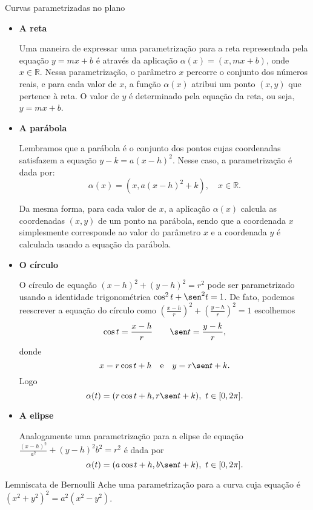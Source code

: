 \begin{example}{Curvas parametrizadas no plano}{}
    \begin{itemize}[label=\color{examplescolor}\textbullet]
        \item \textbf{A reta}
        
        Uma maneira de expressar uma parametrização para a reta representada pela equação $y = mx + b$ é através da aplicação $\alpha(x) = (x, mx + b)$, onde $x \in \mathbb{R}$. Nessa parametrização, o parâmetro $x$ percorre o conjunto dos números reais, e para cada valor de $x$, a função $\alpha(x)$ atribui um ponto $(x, y)$ que pertence à reta. O valor de $y$ é determinado pela equação da reta, ou seja, $y = mx + b$. 

        \item \textbf{A parábola}

Lembramos que a parábola é o conjunto dos pontos cujas coordenadas satisfazem a equação $y - k = a(x - h)^2$.  Nesse caso, a parametrização é dada por:
\[ \alpha(x) = (x, a(x - h)^2 + k), \quad x \in \mathbb{R}.  \]

Da mesma forma, para cada valor de $x$, a aplicação $\alpha(x)$ calcula as coordenadas $(x, y)$ de um ponto na parábola, sendo que a coordenada $x$ simplesmente corresponde ao valor do parâmetro $x$ e a coordenada $y$ é calculada usando a equação da parábola. 

\item \textbf{O círculo}
        
        O círculo de equação $(x-h)^2+(y-h)^2=r^2$ pode ser parametrizado usando a identidade trigonométrica $\cos^2t+\sen^2t=1$. De fato, podemos reescrever a equação do círculo como $\left(\frac{x-h}{r}\right)^2+\left(\frac{y-h}{r}\right)^2=1$ escolhemos
        $$\cos t = \frac{x-h}{r} \quad \mbox \quad \sen t = \frac{y-k}{r},$$
        donde
        $$x=r\cos t + h \quad \mbox{e} \quad y=r\sen t+k.$$
        Logo $$\alpha(t)=(r\cos t + h,r\sen t+k),~t\in[0,2\pi]. $$

        \item \textbf{A elipse}

        Analogamente uma parametrização para a elipse de equação $\frac{(x-h)^2}{a^2}+{(y-h)^2}{b^2}=r^2$ é dada por 
        $$\alpha(t)=(a\cos t + h,b\sen t+k),~t\in[0,2\pi]. $$

    \end{itemize}
\end{example}


\begin{exercise}{Lemniscata de Bernoulli}{}
Ache uma parametrização para a curva cuja equação é $(x^2+y^2)^2=a^2(x^2-y^2)$. 
\end{exercise}


